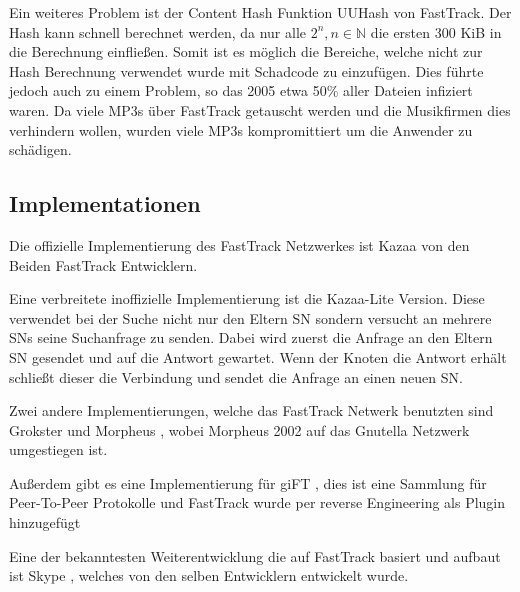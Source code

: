 Ein weiteres Problem ist der Content Hash Funktion UUHash \cite{uuHash} von FastTrack.
Der Hash kann schnell berechnet werden, da nur alle $2^n, n \in \mathbb{N}$ die ersten 300 KiB in die Berechnung einfließen.
Somit ist es möglich die Bereiche, welche nicht zur Hash Berechnung verwendet wurde mit Schadcode zu einzufügen.
Dies führte jedoch auch zu einem Problem, so das 2005 etwa 50\% aller Dateien infiziert waren. \cite{menneck2} 
Da viele MP3s über FastTrack getauscht werden und die Musikfirmen dies verhindern wollen, wurden viele MP3s kompromittiert um die Anwender zu schädigen. \cite{veitinger2002}


\subsection{Implementationen}
\label{subsec:impl}

Die offizielle Implementierung des FastTrack Netzwerkes ist Kazaa \cite{kazaa} von den Beiden FastTrack Entwicklern.

Eine verbreitete inoffizielle Implementierung ist die Kazaa-Lite \cite{kazaaLite} Version.
Diese verwendet bei der Suche nicht nur den Eltern SN sondern versucht an mehrere SNs seine Suchanfrage zu senden.
Dabei wird zuerst die Anfrage an den Eltern SN gesendet und auf die Antwort gewartet.
Wenn der Knoten die Antwort erhält schließt dieser die Verbindung und sendet die Anfrage an einen neuen SN.\cite{liang2006fasttrack}

Zwei andere Implementierungen, welche das FastTrack Netwerk benutzten sind Grokster \cite{grokster} und Morpheus \cite{morpheus}, wobei Morpheus 2002 auf das Gnutella \cite{gnutella} Netzwerk umgestiegen ist. \cite{morphvsKazaa}

Außerdem gibt es eine Implementierung für giFT \cite{gift}, dies ist eine Sammlung für Peer-To-Peer Protokolle und FastTrack wurde per reverse Engineering als Plugin hinzugefügt \cite{liang2006fasttrack}

Eine der bekanntesten Weiterentwicklung die auf FastTrack basiert und aufbaut ist Skype \cite{skypeAna}, welches von den selben Entwicklern entwickelt wurde.